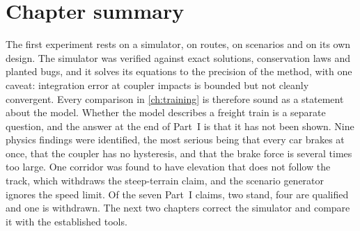 \section{Chapter summary}

The first experiment rests on a simulator, on routes, on scenarios and on its own design. The simulator was verified against exact solutions, conservation laws and planted bugs, and it solves its equations to the precision of the method, with one caveat: integration error at coupler impacts is bounded but not cleanly convergent. Every comparison in \cref{ch:training} is therefore sound as a statement about the model. Whether the model describes a freight train is a separate question, and the answer at the end of Part~I is that it has not been shown. Nine physics findings were identified, the most serious being that every car brakes at once, that the coupler has no hysteresis, and that the brake force is several times too large. One corridor was found to have elevation that does not follow the track, which withdraws the steep-terrain claim, and the scenario generator ignores the speed limit. Of the seven Part~I claims, two stand, four are qualified and one is withdrawn. The next two chapters correct the simulator and compare it with the established tools.
